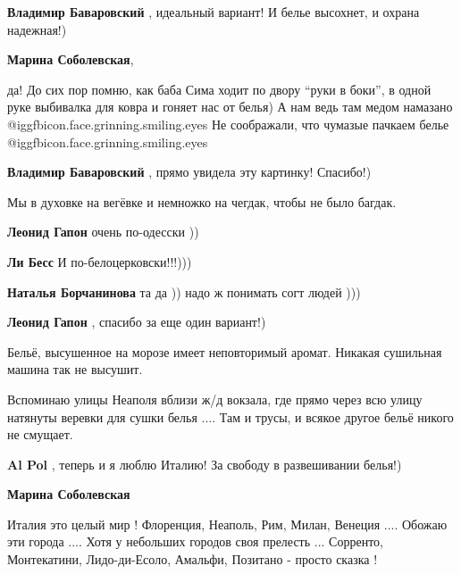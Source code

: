 \begin{itemize}
\begin{itemize}
\textbf{Владимир Баваровский} , идеальный вариант! И белье высохнет, и охрана надежная!)

\begin{itemize} %
\textbf{Марина Соболевская}, 

да! До сих пор помню, как баба Сима ходит по двору \enquote{руки в боки}, в
одной руке выбивалка для ковра и гоняет нас от белья) А нам ведь там медом
намазано @igg{fbicon.face.grinning.smiling.eyes}  Не соображали, что чумазые
пачкаем белье @igg{fbicon.face.grinning.smiling.eyes} 


\textbf{Владимир Баваровский} , прямо увидела эту картинку! Спасибо!)
\end{itemize} %

\end{itemize} %

Мы в духовке на вегёвке и немножко на чегдак, чтобы не было багдак.

\begin{itemize} %
\textbf{Леонид Гапон} очень по-одесски ))

\textbf{Ли Бесс} И по-белоцерковски!!!)))

\textbf{Наталья Борчанинова} та да )) надо ж понимать согт людей )))

\textbf{Леонид Гапон} , спасибо за еще один вариант!)
\end{itemize} %


Бельё, высушенное на морозе имеет неповторимый аромат. Никакая сушильная машина
так не высушит.

Вспоминаю улицы Неаполя вблизи ж/д вокзала, где прямо через всю улицу натянуты
веревки для сушки белья .... Там и трусы, и всякое другое бельё никого не
смущает.

\begin{itemize} %
\textbf{Al Pol} , теперь и я люблю Италию! За свободу в развешивании белья!)

\begin{itemize} %
\textbf{Марина Соболевская} 

Италия это целый мир ! Флоренция, Неаполь, Рим, Милан, Венеция .... Обожаю
эти города .... Хотя у небольших городов своя прелесть ... Сорренто,
Монтекатини, Лидо-ди-Есоло, Амальфи, Позитано - просто сказка !


\end{itemize}
\end{itemize}
\end{itemize}
